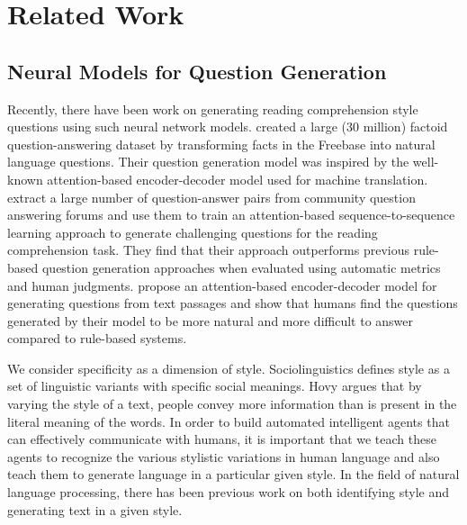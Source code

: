\documentclass[11pt,a4paper]{article}
\begin{document}
\section{Related Work}

\subsection{Neural Models for Question Generation}
Recently, there have been work on generating reading comprehension style questions using such neural network models. 
\cite{serban2016generating} created a large (30 million) factoid question-answering dataset by transforming facts in the Freebase into natural language questions. 
Their question generation model was inspired by the well-known attention-based encoder-decoder model \citep{luong2015effective} used for machine translation.
\cite{duan2017question} extract a large number of question-answer pairs from community question answering forums and use them to train an attention-based sequence-to-sequence learning approach to generate challenging questions for the reading comprehension task.  They find that their approach outperforms previous rule-based question generation approaches when evaluated using automatic metrics and human judgments. 
\cite{du2017learning} propose an attention-based encoder-decoder model for generating questions from text passages and show that humans find the questions generated by their model to be more natural and more difficult to answer compared to rule-based systems. 

We consider specificity as a dimension of style. Sociolinguistics defines style as a set of linguistic variants with specific social meanings. 
Hovy \cite{hovy1987generating} argues that by varying the style of a text, people convey more information than is present in the literal meaning of the words.
In order to build automated intelligent agents that can effectively communicate with humans, it is important that we teach these agents to recognize the various stylistic variations in human language and also teach them to generate language in a particular given style. 
In the field of natural language processing, there has been previous work on both identifying style and generating text in a given style. 
\end{document}
